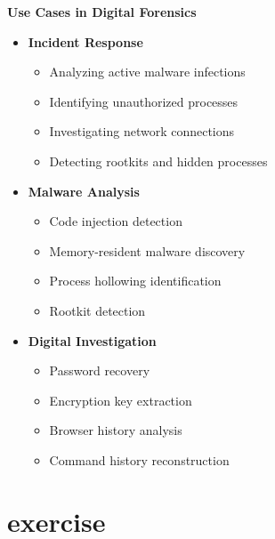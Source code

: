 \textbf{Use Cases in Digital Forensics}
\begin{itemize}
   \item \textbf{Incident Response}
       \begin{itemize}
           \item Analyzing active malware infections
           \item Identifying unauthorized processes
           \item Investigating network connections
           \item Detecting rootkits and hidden processes
       \end{itemize}
   \item \textbf{Malware Analysis}
       \begin{itemize}
           \item Code injection detection
           \item Memory-resident malware discovery
           \item Process hollowing identification
           \item Rootkit detection
       \end{itemize}
   \item \textbf{Digital Investigation}
       \begin{itemize}
           \item Password recovery
           \item Encryption key extraction
           \item Browser history analysis
           \item Command history reconstruction
       \end{itemize}
\end{itemize}

\section{exercise}
